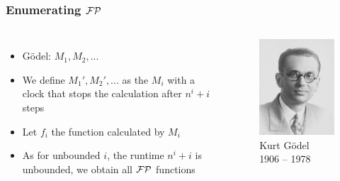 \begin{frame}
  \frametitle{Enumerating \(\mathcal{FP}\)}

  \begin{columns}
      \begin{itemize}
        \item<2-> Gödel: \(M_1, M_2, ...\)
        \item<3-> We define \(M_1', M_2', ...\) as the \(M_i\) with a clock that stops the calculation after \(n^i + i\) steps
        \item<4-> Let \(f_i\) the function calculated by \(M_i\)
        \item<5-> As for unbounded \(i\), the runtime \(n^i + i\) is unbounded, we obtain all \(\mathcal{FP}\) functions
      \end{itemize}

      \begin{figure}
        \includegraphics[width=\textwidth]{Presentation/Images/KurtGoedel.jpg}
        \caption{Kurt Gödel \\ 1906 -- 1978}
      \end{figure}
  \end{columns}
\end{frame}

